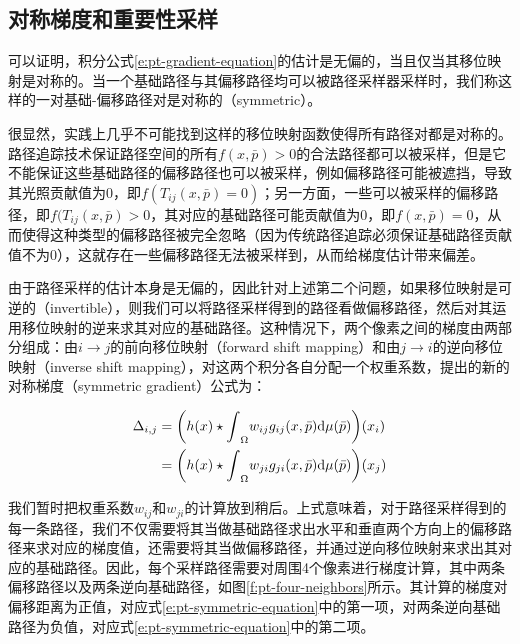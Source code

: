\subsection{对称梯度和重要性采样}
可以证明，积分公式\ref{e:pt-gradient-equation}的估计是无偏的，当且仅当其移位映射是对称的。当一个基础路径与其偏移路径均可以被路径采样器采样时，我们称这样的一对基础-偏移路径对是对称的（symmetric）。

很显然，实践上几乎不可能找到这样的移位映射函数使得所有路径对都是对称的。路径追踪技术保证路径空间的所有$f(x,\bar{p})>0$的合法路径都可以被采样，但是它不能保证这些基础路径的偏移路径也可以被采样，例如偏移路径可能被遮挡，导致其光照贡献值为0，即$f(T_{ij}(x,\bar{p})=0)$；另一方面，一些可以被采样的偏移路径，即$f(T_{ij}(x,\bar{p})>0$，其对应的基础路径可能贡献值为0，即$f(x,\bar{p})=0$，从而使得这种类型的偏移路径被完全忽略（因为传统路径追踪必须保证基础路径贡献值不为0），这就存在一些偏移路径无法被采样到，从而给梯度估计带来偏差。

由于路径采样的估计本身是无偏的，因此针对上述第二个问题，如果移位映射是可逆的（invertible），则我们可以将路径采样得到的路径看做偏移路径，然后对其运用移位映射的逆来求其对应的基础路径。这种情况下，两个像素之间的梯度由两部分组成：由$i\to j$的前向移位映射（forward shift mapping）和由$j\to i$的逆向移位映射（inverse shift mapping），对这两个积分各自分配一个权重系数，\cite{a:ImprovedSamplingforGradientDomainMetropolisLightTransport}提出的新的对称梯度（symmetric gradient）公式为：

\begin{equation}\label{e:pt-symmetric-equation}
\begin{aligned}
	\Delta_{i,j}&=\bigg(h(x)\star{\rm \int}_\Omega w_{ij} g_{ij}(x, \bar{p}){\rm d}\mu(\bar{p}) \bigg)(x_i)\\
	&=\bigg(h(x)\star{\rm \int}_\Omega w_{ji} g_{ji}(x, \bar{p}){\rm d}\mu(\bar{p}) \bigg)(x_j)
\end{aligned}
\end{equation}

我们暂时把权重系数$w_{ij}$和$w_{ji}$的计算放到稍后。上式意味着，对于路径采样得到的每一条路径，我们不仅需要将其当做基础路径求出水平和垂直两个方向上的偏移路径来求对应的梯度值，还需要将其当做偏移路径，并通过逆向移位映射来求出其对应的基础路径。因此，每个采样路径需要对周围4个像素进行梯度计算，其中两条偏移路径以及两条逆向基础路径，如图\ref{f:pt-four-neighbors}所示。其计算的梯度对偏移距离为正值，对应式\ref{e:pt-symmetric-equation}中的第一项，对两条逆向基础路径为负值，对应式\ref{e:pt-symmetric-equation}中的第二项。

